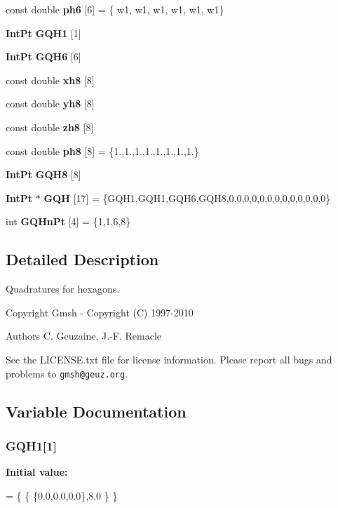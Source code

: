 \begin{DoxyCompactItemize}
\item 
const double {\bfseries ph6} [6] = \{ w1, w1, w1, w1, w1, w1\}\label{GaussQuadratureHex_8cc_aa63dd962d4e15d1b005d452adfbe6617}

\item 
{\bf Int\-Pt} {\bfseries G\-Q\-H1} [1]
\item 
{\bf Int\-Pt} {\bfseries G\-Q\-H6} [6]
\item 
const double {\bfseries xh8} [8]
\item 
const double {\bfseries yh8} [8]
\item 
const double {\bfseries zh8} [8]
\item 
const double {\bfseries ph8} [8] = \{1.,1.,1.,1.,1.,1.,1.,1.\}\label{GaussQuadratureHex_8cc_a3000f71085151021681d3c39bc7590f0}

\item 
{\bf Int\-Pt} {\bfseries G\-Q\-H8} [8]
\item 
{\bf Int\-Pt} $\ast$ {\bfseries G\-Q\-H} [17] = \{G\-Q\-H1,G\-Q\-H1,G\-Q\-H6,G\-Q\-H8,0,0,0,0,0,0,0,0,0,0,0,0,0\}\label{GaussQuadratureHex_8cc_a311121602488f4c53bd4e0ab7bdf1f00}

\item 
int {\bfseries G\-Q\-Hn\-Pt} [4] = \{1,1,6,8\}\label{GaussQuadratureHex_8cc_a4d3ffacf299fe9ce7091c2244bb5a753}

\end{DoxyCompactItemize}


\subsection{Detailed Description}
Quadratures for hexagons. \begin{DoxyCopyright}{Copyright}
Gmsh -\/ Copyright (C) 1997-\/2010 
\end{DoxyCopyright}
\begin{DoxyAuthor}{Authors}
C. Geuzaine, J.-\/\-F. Remacle
\end{DoxyAuthor}
See the L\-I\-C\-E\-N\-S\-E.\-txt file for license information. Please report all bugs and problems to {\tt gmsh@geuz.\-org}. 

\subsection{Variable Documentation}
\subsubsection[{G\-Q\-H1}]{ G\-Q\-H1[1]}\label{GaussQuadratureHex_8cc_af4e76a58176512ec91c4efe5ccc33717}
{\bfseries Initial value\-:}
\begin{DoxyCode}
= 
\{
  \{ \{0.0,0.0,0.0\},8.0 \}
\}
\end{DoxyCode}
